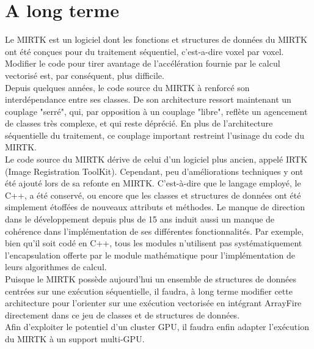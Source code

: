\documentclass[10pt]{report}
\begin{document}
	\section{A long terme}
	Le MIRTK est un logiciel dont les fonctions et structures de données du MIRTK ont été conçues pour du traitement séquentiel, c'est-a-dire voxel par voxel. Modifier le code pour tirer avantage de l'accélération fournie par le calcul vectorisé est, par conséquent, plus difficile.\\
	Depuis quelques années, le code source du MIRTK à renforcé son interdépendance entre ses classes. De son architecture ressort maintenant un couplage "serré", qui, par opposition à un couplage "libre", reflète un agencement de classes très complexe, et qui reste déprécié. En plus de l'architecture séquentielle du traitement, ce couplage important restreint l'usinage du code du MIRTK.\\
	Le code source du MIRTK dérive de celui d'un logiciel plus ancien, appelé IRTK (Image Registration ToolKit). Cependant, peu d'améliorations techniques y ont été ajouté lors de sa refonte en MIRTK. C'est-à-dire que le langage employé, le C++, a été conservé, ou encore que les classes et structures de données ont été simplement étoffées de nouveaux attributs et méthodes. Le manque de direction dans le développement depuis plus de 15 ans induit aussi un manque de cohérence dans l'implémentation de ses différentes fonctionnalités. Par exemple, bien qu'il soit codé en C++, tous les modules n'utilisent pas systématiquement l'encapsulation offerte par le module mathématique pour l'implémentation de leurs algorithmes de calcul.\\	
	Puisque le MIRTK possède aujourd'hui un ensemble de structures de données centrées sur une exécution séquentielle, il faudra, à long terme modifier cette architecture pour l'orienter sur une exécution vectorisée en intégrant ArrayFire directement dans ce jeu de classes et de structures de données.\\ 
	Afin d'exploiter le potentiel d'un cluster GPU, il faudra enfin adapter l'exécution du MIRTK à un support multi-GPU.  
\end{document}
